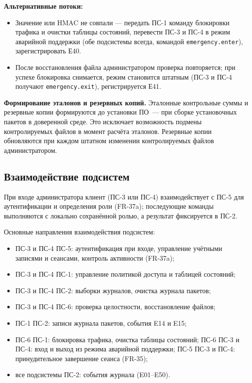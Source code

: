 \documentclass[13pt,a4paper,final]{article}
\begin{document}
\begin{enumerate}
		\textbf{Альтернативные потоки:}
		\begin{itemize}
			\item Значение или HMAC не совпали — передать ПС-1 команду блокировки трафика и очистки таблицы состояний, перевести ПС-3 и ПС-4 в режим аварийной поддержки {(обе подсистемы всегда, командой \texttt{emergency.enter})}, зарегистрировать Е40.
			\item После восстановления файла администратором проверка повторяется; при успехе блокировка снимается, режим становится штатным {(ПС-3 и ПС-4 получают \texttt{emergency.exit})}, регистрируется Е41.
		\end{itemize}
		
		\textbf{Формирование эталонов и резервных копий.} Эталонные контрольные суммы и резервные копии формируются до установки ПО~--- при сборке установочных пакетов в доверенной среде. Это исключает возможность подмены контролируемых файлов в момент расчёта эталонов. Резервные копии обновляются при каждом штатном изменении контролируемых файлов администратором.
		
	\end{enumerate}
	
	\subsection{Взаимодействие подсистем}
	{При входе администратора клиент (ПС-3 или ПС-4) взаимодействует с ПС-5 для аутентификации и определения роли (FR-37a); последующие команды выполняются с локально сохранённой ролью, а результат фиксируется в ПС-2.}
	
	Основные направления взаимодействия подсистем:
	\begin{itemize}
		\item ПС-3 и ПС-4 \textrightarrow{} ПС-5: {аутентификация при входе, управление учётными записями и сеансами, контроль активности (FR-37a)};
		\item ПС-3 и ПС-4 \textrightarrow{} ПС-1: управление политикой доступа и таблицей состояний;
		\item ПС-3 и ПС-4 \textrightarrow{} ПС-2: выборки журналов, очистка журнала пакетов;
		\item ПС-3 и ПС-4 \textrightarrow{} ПС-6: проверка целостности, восстановление файлов;
		\item ПС-1 \textrightarrow{} ПС-2: записи журнала пакетов, события E14 и E15;
		\item ПС-6 \textrightarrow{} ПС-1: блокировка трафика, очистка таблицы состояний; ПС-6 \textrightarrow{} ПС-3 и ПС-4: вход и выход из режима аварийной поддержки; {ПС-5 \textrightarrow{} ПС-3 и ПС-4: принудительное завершение сеанса (FR-35);}
		\item все подсистемы \textrightarrow{} ПС-2: события журнала (E01--E50).
	\end{itemize}
	
\end{document}
